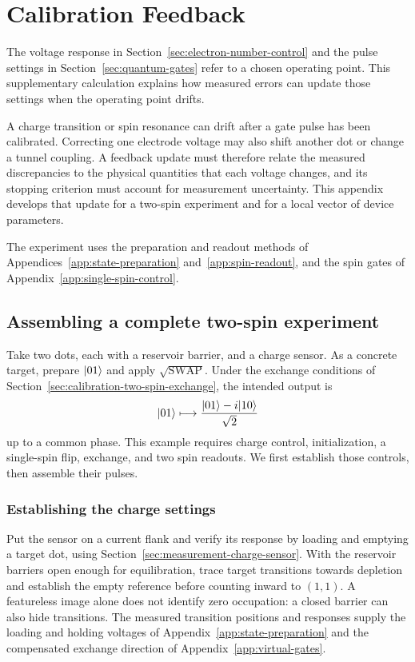 \FloatBarrier
\section{Calibration Feedback}
\label{app:calibration-feedback}

\label{sec:automated-tuning-workflows}

The voltage response in Section~\ref{sec:electron-number-control} and
the pulse settings in Section~\ref{sec:quantum-gates} refer to a chosen
operating point. This supplementary calculation explains how measured
errors can update those settings when the operating point drifts.

A charge transition or spin resonance can drift after a gate pulse has
been calibrated. Correcting one electrode voltage may also shift another
dot or change a tunnel coupling. A feedback update must therefore relate
the measured discrepancies to the physical quantities that each voltage
changes, and its stopping criterion must account for measurement
uncertainty. This appendix develops that update for a two-spin experiment
and for a local vector of device parameters.

The experiment uses the preparation and readout methods of
Appendices~\ref{app:state-preparation} and~\ref{app:spin-readout},
and the spin gates of Appendix~\ref{app:single-spin-control}.

\subsection{Assembling a complete two-spin experiment}

Take two dots, each with a reservoir barrier, and a charge sensor.
As a concrete target, prepare $\lvert 01\rangle$ and apply
$\sqrt{\mathrm{SWAP}}$. Under the exchange conditions of
Section~\ref{sec:calibration-two-spin-exchange}, the intended output is
\[
 \lvert 01\rangle\longmapsto
 \frac{\lvert 01\rangle-i\lvert 10\rangle}{\sqrt2}
\]
up to a common phase. This example requires charge control,
initialization, a single-spin flip, exchange, and two spin readouts.
We first establish those controls, then assemble their pulses.

\subsubsection{Establishing the charge settings}
Put the sensor on a current flank and verify its response by loading
and emptying a target dot, using
Section~\ref{sec:measurement-charge-sensor}. With the reservoir
barriers open enough for equilibration, trace target transitions
towards depletion and establish the empty reference before counting
inward to $(1,1)$. A featureless image alone does not identify zero
occupation: a closed barrier can also hide transitions.
The measured transition positions and responses supply the loading
and holding voltages of Appendix~\ref{app:state-preparation}
and the compensated exchange direction of
Appendix~\ref{app:virtual-gates}.

